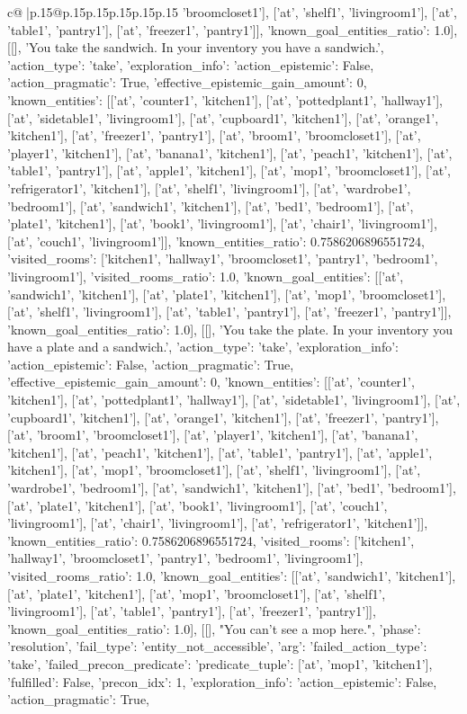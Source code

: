 \documentclass{article}
\begin{document}
{\begin{supertabular}{c@{$\;$}|p{.15\linewidth}@{}p{.15\linewidth}p{.15\linewidth}p{.15\linewidth}p{.15\linewidth}p{.15\linewidth}}
{{{'broomcloset1'], ['at', 'shelf1', 'livingroom1'], ['at', 'table1', 'pantry1'], ['at', 'freezer1', 'pantry1']], 'known_goal_entities_ratio': 1.0}}], [[], 'You take the sandwich. In your inventory you have a sandwich.', {'action_type': 'take', 'exploration_info': {'action_epistemic': False, 'action_pragmatic': True, 'effective_epistemic_gain_amount': 0, 'known_entities': [['at', 'counter1', 'kitchen1'], ['at', 'pottedplant1', 'hallway1'], ['at', 'sidetable1', 'livingroom1'], ['at', 'cupboard1', 'kitchen1'], ['at', 'orange1', 'kitchen1'], ['at', 'freezer1', 'pantry1'], ['at', 'broom1', 'broomcloset1'], ['at', 'player1', 'kitchen1'], ['at', 'banana1', 'kitchen1'], ['at', 'peach1', 'kitchen1'], ['at', 'table1', 'pantry1'], ['at', 'apple1', 'kitchen1'], ['at', 'mop1', 'broomcloset1'], ['at', 'refrigerator1', 'kitchen1'], ['at', 'shelf1', 'livingroom1'], ['at', 'wardrobe1', 'bedroom1'], ['at', 'sandwich1', 'kitchen1'], ['at', 'bed1', 'bedroom1'], ['at', 'plate1', 'kitchen1'], ['at', 'book1', 'livingroom1'], ['at', 'chair1', 'livingroom1'], ['at', 'couch1', 'livingroom1']], 'known_entities_ratio': 0.7586206896551724, 'visited_rooms': ['kitchen1', 'hallway1', 'broomcloset1', 'pantry1', 'bedroom1', 'livingroom1'], 'visited_rooms_ratio': 1.0, 'known_goal_entities': [['at', 'sandwich1', 'kitchen1'], ['at', 'plate1', 'kitchen1'], ['at', 'mop1', 'broomcloset1'], ['at', 'shelf1', 'livingroom1'], ['at', 'table1', 'pantry1'], ['at', 'freezer1', 'pantry1']], 'known_goal_entities_ratio': 1.0}}], [[], 'You take the plate. In your inventory you have a plate and a sandwich.', {'action_type': 'take', 'exploration_info': {'action_epistemic': False, 'action_pragmatic': True, 'effective_epistemic_gain_amount': 0, 'known_entities': [['at', 'counter1', 'kitchen1'], ['at', 'pottedplant1', 'hallway1'], ['at', 'sidetable1', 'livingroom1'], ['at', 'cupboard1', 'kitchen1'], ['at', 'orange1', 'kitchen1'], ['at', 'freezer1', 'pantry1'], ['at', 'broom1', 'broomcloset1'], ['at', 'player1', 'kitchen1'], ['at', 'banana1', 'kitchen1'], ['at', 'peach1', 'kitchen1'], ['at', 'table1', 'pantry1'], ['at', 'apple1', 'kitchen1'], ['at', 'mop1', 'broomcloset1'], ['at', 'shelf1', 'livingroom1'], ['at', 'wardrobe1', 'bedroom1'], ['at', 'sandwich1', 'kitchen1'], ['at', 'bed1', 'bedroom1'], ['at', 'plate1', 'kitchen1'], ['at', 'book1', 'livingroom1'], ['at', 'couch1', 'livingroom1'], ['at', 'chair1', 'livingroom1'], ['at', 'refrigerator1', 'kitchen1']], 'known_entities_ratio': 0.7586206896551724, 'visited_rooms': ['kitchen1', 'hallway1', 'broomcloset1', 'pantry1', 'bedroom1', 'livingroom1'], 'visited_rooms_ratio': 1.0, 'known_goal_entities': [['at', 'sandwich1', 'kitchen1'], ['at', 'plate1', 'kitchen1'], ['at', 'mop1', 'broomcloset1'], ['at', 'shelf1', 'livingroom1'], ['at', 'table1', 'pantry1'], ['at', 'freezer1', 'pantry1']], 'known_goal_entities_ratio': 1.0}}], [[], "You can't see a mop here.", {'phase': 'resolution', 'fail_type': 'entity_not_accessible', 'arg': {'failed_action_type': 'take', 'failed_precon_predicate': {'predicate_tuple': ['at', 'mop1', 'kitchen1'], 'fulfilled': False, 'precon_idx': 1}}, 'exploration_info': {'action_epistemic': False, 'action_pragmatic': True, }}}
\end{supertabular}}
\end{document}
